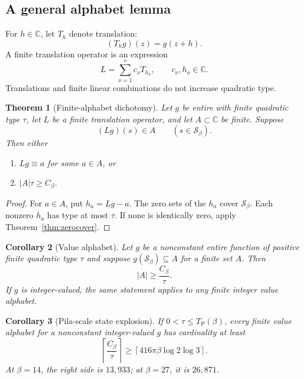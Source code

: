 \documentclass[11pt,oneside]{article}
\newtheorem{theorem}{Theorem}[section]
\newtheorem{corollary}[theorem]{Corollary}
\theoremstyle{definition}
\theoremstyle{remark}
\newcommand{\C}{\mathbb C}
\newcommand{\Sbeta}{\mathcal S_\beta}
\newcommand{\Cbeta}{C_\beta}
\newcommand{\TP}{T_{\mathrm P}(\beta)}
\newcommand{\Tsh}[1]{T_{#1}}
\begin{document}
\subsection{A general alphabet lemma}

For $h\in\C$, let $\Tsh{h}$ denote translation:
\[
 (\Tsh{h}g)(z)=g(z+h).
\]
A finite translation operator is an expression
\[
 L=\sum_{\nu=1}^{r}c_\nu\Tsh{h_\nu},
 \qquad c_\nu,h_\nu\in\C.
\]
Translations and finite linear combinations do not increase quadratic type.

\begin{theorem}[Finite-alphabet dichotomy]
\label{thm:alphabet}
Let $g$ be entire with finite quadratic type $\tau$, let $L$ be a finite translation
operator, and let $A\subset\C$ be finite.  Suppose
\[
 (Lg)(s)\in A\qquad(s\in\Sbeta).
\]
Then either
\begin{enumerate}
\item $Lg\equiv a$ for some $a\in A$, or
\item $|A|\tau\ge\Cbeta$.
\end{enumerate}
\end{theorem}

\begin{proof}
For $a\in A$, put $h_a=Lg-a$.  The zero sets of the $h_a$ cover $\Sbeta$.  Each nonzero
$h_a$ has type at most $\tau$.  If none is identically zero, apply
Theorem~\ref{thm:zerocover}.
\end{proof}

\begin{corollary}[Value alphabet]
\label{cor:valuealphabet}
Let $g$ be a nonconstant entire function of positive finite quadratic type $\tau$ and
suppose $g(\Sbeta)\subseteq A$ for a finite set $A$.  Then
\[
 |A|\ge\frac{\Cbeta}{\tau}.
\]
If $g$ is integer-valued, the same statement applies to any finite integer value alphabet.
\end{corollary}

\begin{corollary}[Pila-scale state explosion]
\label{cor:stateexplosion}
If $0<\tau\le\TP$, every finite value alphabet for a nonconstant integer-valued $g$ has
cardinality at least
\begin{equation}
 \left\lceil\frac{\Cbeta}{\tau}\right\rceil
 \ge
 \left\lceil416\pi\beta\log2\log3\right\rceil.
 \label{eq:states}
\end{equation}
At $\beta=14$, the right side is $13{,}933$; at $\beta=27$, it is $26{,}871$.
\end{corollary}
\end{document}
